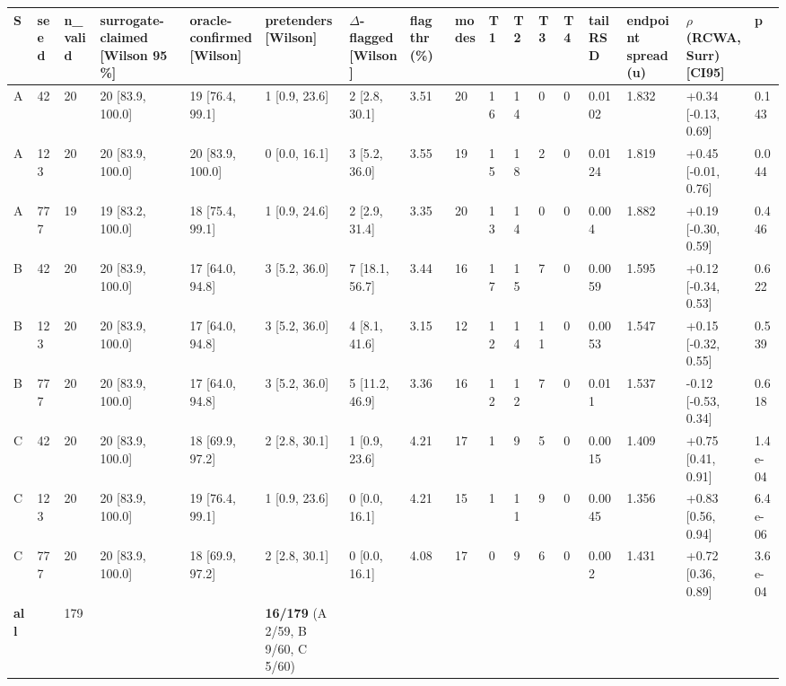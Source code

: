 \documentclass[11pt,a4paper]{article}
\newcounter{none}   %
\begin{document}
\begin{landscape}
\begingroup
\setlength{\tabcolsep}{2pt}\tiny
{}
\label{tab:1}
{\def\LTcaptype{none} %
\begin{longtable}[]{@{}lllllllllllllllll@{}}
\toprule\noalign{}
S & seed & n\_valid & surrogate-claimed {[}Wilson 95 \%{]} & oracle-confirmed {[}Wilson{]} & pretenders {[}Wilson{]} & \ensuremath{\Delta}-flagged {[}Wilson{]} & flag thr (\%) & modes & T1 & T2 & T3 & T4 & tail RSD & endpoint spread (u) & \ensuremath{\rho}(RCWA, Surr) {[}CI95{]} & p \\
\midrule\noalign{}
\endhead
\bottomrule\noalign{}
\endlastfoot
A & 42 & 20 & 20 {[}83.9, 100.0{]} & 19 {[}76.4, 99.1{]} & 1 {[}0.9, 23.6{]} & 2 {[}2.8, 30.1{]} & 3.51 & 20 & 16 & 14 & 0 & 0 & 0.0102 & 1.832 & +0.34 {[}-0.13, 0.69{]} & 0.143 \\
A & 123 & 20 & 20 {[}83.9, 100.0{]} & 20 {[}83.9, 100.0{]} & 0 {[}0.0, 16.1{]} & 3 {[}5.2, 36.0{]} & 3.55 & 19 & 15 & 18 & 2 & 0 & 0.0124 & 1.819 & +0.45 {[}-0.01, 0.76{]} & 0.044 \\
A & 777 & 19 & 19 {[}83.2, 100.0{]} & 18 {[}75.4, 99.1{]} & 1 {[}0.9, 24.6{]} & 2 {[}2.9, 31.4{]} & 3.35 & 20 & 13 & 14 & 0 & 0 & 0.004 & 1.882 & +0.19 {[}-0.30, 0.59{]} & 0.446 \\
B & 42 & 20 & 20 {[}83.9, 100.0{]} & 17 {[}64.0, 94.8{]} & 3 {[}5.2, 36.0{]} & 7 {[}18.1, 56.7{]} & 3.44 & 16 & 17 & 15 & 7 & 0 & 0.0059 & 1.595 & +0.12 {[}-0.34, 0.53{]} & 0.622 \\
B & 123 & 20 & 20 {[}83.9, 100.0{]} & 17 {[}64.0, 94.8{]} & 3 {[}5.2, 36.0{]} & 4 {[}8.1, 41.6{]} & 3.15 & 12 & 12 & 14 & 11 & 0 & 0.0053 & 1.547 & +0.15 {[}-0.32, 0.55{]} & 0.539 \\
B & 777 & 20 & 20 {[}83.9, 100.0{]} & 17 {[}64.0, 94.8{]} & 3 {[}5.2, 36.0{]} & 5 {[}11.2, 46.9{]} & 3.36 & 16 & 12 & 12 & 7 & 0 & 0.011 & 1.537 & -0.12 {[}-0.53, 0.34{]} & 0.618 \\
C & 42 & 20 & 20 {[}83.9, 100.0{]} & 18 {[}69.9, 97.2{]} & 2 {[}2.8, 30.1{]} & 1 {[}0.9, 23.6{]} & 4.21 & 17 & 1 & 9 & 5 & 0 & 0.0015 & 1.409 & +0.75 {[}0.41, 0.91{]} & 1.4e-04 \\
C & 123 & 20 & 20 {[}83.9, 100.0{]} & 19 {[}76.4, 99.1{]} & 1 {[}0.9, 23.6{]} & 0 {[}0.0, 16.1{]} & 4.21 & 15 & 1 & 11 & 9 & 0 & 0.0045 & 1.356 & +0.83 {[}0.56, 0.94{]} & 6.4e-06 \\
C & 777 & 20 & 20 {[}83.9, 100.0{]} & 18 {[}69.9, 97.2{]} & 2 {[}2.8, 30.1{]} & 0 {[}0.0, 16.1{]} & 4.08 & 17 & 0 & 9 & 6 & 0 & 0.002 & 1.431 & +0.72 {[}0.36, 0.89{]} & 3.6e-04 \\
\textbf{all} & & 179 & & & \textbf{16/179} (A 2/59, B 9/60, C 5/60) & & & & & & & & & & & \\
\end{longtable}
}
\endgroup
\end{landscape}
\end{document}
